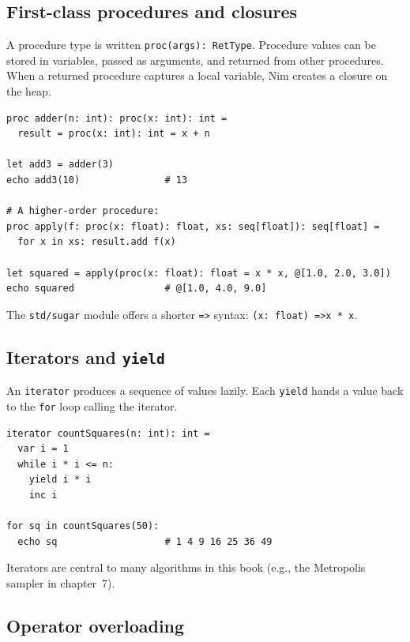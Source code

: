 \documentclass[justified, sixbynine]{tufte-book}
\def\ft{\small\tt}
\theoremstyle{plain}%
\newtheorem * {corollary}{Corollary}
\theoremstyle{definition}
\theoremstyle{remark}
\newtheorem * {remark}{Remark}
\newtheorem * {note}{Note}
\begin{document}
\begin{fullwidth}
\goodbreak\subsection{First-class procedures and closures}


A procedure type is written {\ft proc(args): RetType}. Procedure values can be stored in variables, passed as arguments, and returned from other procedures. When a returned procedure captures a local variable, Nim creates a closure on the heap.

\begin{lstlisting}
proc adder(n: int): proc(x: int): int =
  result = proc(x: int): int = x + n

let add3 = adder(3)
echo add3(10)               # 13

# A higher-order procedure:
proc apply(f: proc(x: float): float, xs: seq[float]): seq[float] =
  for x in xs: result.add f(x)

let squared = apply(proc(x: float): float = x * x, @[1.0, 2.0, 3.0])
echo squared                # @[1.0, 4.0, 9.0]
\end{lstlisting}

The {\ft std/sugar} module offers a shorter {\ft =>} syntax: {\ft (x: float) =\textgreater  x * x}.

\goodbreak\subsection{Iterators and {\ft yield}}


An {\ft iterator} produces a sequence of values lazily. Each {\ft yield} hands a value back to the {\ft for} loop calling the iterator.

\begin{lstlisting}
iterator countSquares(n: int): int =
  var i = 1
  while i * i <= n:
    yield i * i
    inc i

for sq in countSquares(50):
  echo sq                   # 1 4 9 16 25 36 49
\end{lstlisting}

Iterators are central to many algorithms in this book (e.g., the Metropolis sampler in chapter~7).

\goodbreak\subsection{Operator overloading}


\end{fullwidth}
\end{document}
